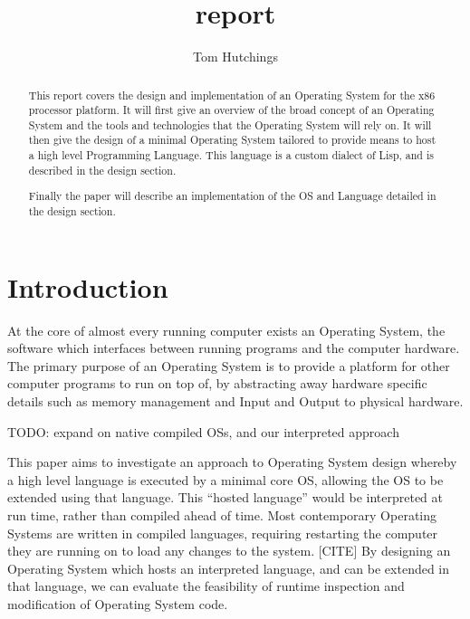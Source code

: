 \documentclass[11pt]{report}
\begin{document}
\title{report}
\author{Tom Hutchings}

\maketitle

\begin{abstract}
  This report covers the design and implementation of an Operating System for the x86 processor platform. It will first give an overview of the broad concept of an Operating System and the tools and technologies that the Operating System will rely on. It will then give the design of a minimal Operating System tailored to provide means to host a high level Programming Language. This language is a custom dialect of Lisp, and is described in the design section.

  Finally the paper will describe an implementation of the OS and Language detailed in the design section.
  
\end{abstract}

\tableofcontents
\newpage

\chapter{Introduction}
At the core of almost every running computer exists an Operating System, the software which interfaces between running programs and the computer hardware. The primary purpose of an Operating System is to provide a platform for other computer programs to run on top of, by abstracting away hardware specific details such as memory management and Input and Output to physical hardware.

TODO: expand on native compiled OSs, and our interpreted approach

This paper aims to investigate an approach to Operating System design whereby a high level language is executed by a minimal core OS, allowing the OS to be extended using that language. This ``hosted language'' would be interpreted at run time, rather than compiled ahead of time. Most contemporary Operating Systems are written in compiled languages, requiring restarting the computer they are running on to load any changes to the system. [CITE] By designing an Operating System which hosts an interpreted language, and can be extended in that language, we can evaluate the feasibility of runtime inspection and modification of Operating System code.
\end{document}
